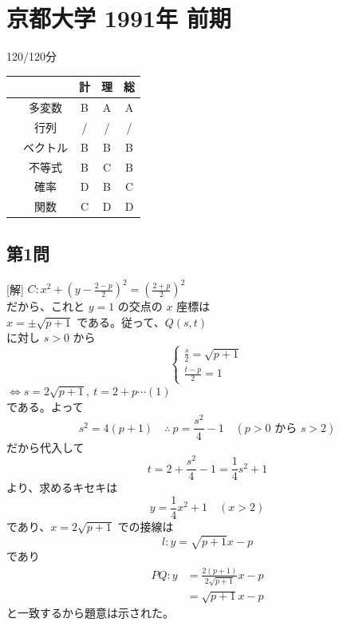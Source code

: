 \documentclass[../main.tex]{subfiles}
\begin{document}
\section*{京都大学 1991年 前期}
\begin{flushright}
  120/120分
\end{flushright}
\begin{center}
  \begin{tabular}{|c|c|c|c|c|}
    \hline
    & & 計 & 理 & 総 \\
    \hline
    [1] & 多変数 & B & A & A \\
    \hline
    [2] & 行列 & / & / & / \\
    \hline
    [3] & ベクトル & B & B & B \\
    \hline
    [4] & 不等式 & B & C & B \\
    \hline
    [5] & 確率 & D & B & C \\
    \hline
    [6] & 関数 & C & D & D \\
    \hline
  \end{tabular}
\end{center}

\subsection*{第1問}
[解] $C: x^2 + \left(y - \frac{2-p}{2}\right)^2 = \left(\frac{2+p}{2}\right)^2$ \\
だから、これと $y=1$ の交点の $x$ 座標は \\
$x = \pm \sqrt{p+1}$ である。従って、$Q(s, t)$ \\
に対し $s > 0$ から
\[
  \begin{cases}
    \frac{s}{2} = \sqrt{p+1} \\
    \frac{t-p}{2} = 1
  \end{cases}
\]
$\Leftrightarrow s = 2\sqrt{p+1}, \ t = 2+p \cdots (1)$ \\
である。よって
\[ s^2 = 4(p+1) \quad \therefore \ p = \frac{s^2}{4} - 1 \quad (p > 0 \text{ から } s > 2) \]
だから代入して
\[ t = 2 + \frac{s^2}{4} - 1 = \frac{1}{4}s^2 + 1 \]
より、求めるキセキは
\[ y = \frac{1}{4}x^2 + 1 \quad (x > 2) \]
であり、$x = 2\sqrt{p+1}$ での接線は
\[ l: y = \sqrt{p+1}x - p \]
であり
\begin{align*}
  PQ: y &= \frac{2(p+1)}{2\sqrt{p+1}}x - p \\
  &= \sqrt{p+1}x - p
\end{align*}
と一致するから題意は示された。
\begin{center}
\end{center}
\end{document}
